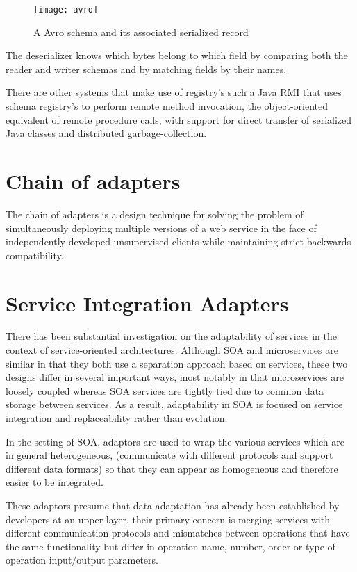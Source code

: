 \begin{figure}[htbp]
    \centering
    \texttt{[image: avro]}
    \caption{A Avro schema and its associated serialized record }
    \label{fig:avro}
\end{figure}

The deserializer knows which bytes belong to which field by comparing both the reader and writer schemas and by matching fields by their names.

There are other systems that make use of registry's such a Java RMI that uses schema registry's
to perform remote method invocation, the object-oriented equivalent of remote procedure calls, with support for direct
transfer of serialized Java classes and distributed garbage-collection.

\section{Chain of adapters} %
\label{sec:chain_of_adapters}

The chain of adapters is a design technique for solving the problem of simultaneously deploying
multiple versions of a web service in the face of independently
developed unsupervised clients while maintaining strict backwards compatibility.


\section{Service Integration Adapters} %
\label{sec:service_integration_adapters}

There has been substantial investigation on the adaptability of services in the context of service-oriented architectures.
Although SOA and microservices are similar in that they both use a separation approach based on services,
these two designs differ in several important ways, most notably in that microservices are loosely coupled whereas SOA services are tightly tied due to common data storage between services.
As a result, adaptability in SOA is focused on service integration and replaceability rather than evolution.

In the setting of SOA, adaptors are used to wrap the various services which are in general heterogeneous,
(communicate with different protocols and support different data formats) so that they can appear as homogeneous and therefore easier to be integrated.

These adaptors presume that data adaptation has already been established by developers at an upper layer,
their primary concern is merging services with different communication protocols and mismatches between operations that have the
same functionality but differ in operation name, number, order or type of operation input/output parameters.

